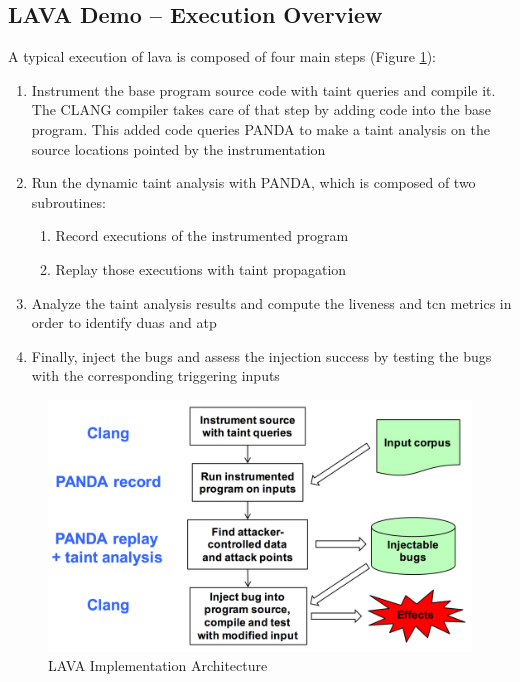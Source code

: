 \subsection{LAVA Demo -- Execution Overview}

A typical execution of \gls{lava} is composed of four main steps (Figure \ref{fig:lava-process}):

\begin{enumerate}
    \item Instrument the base program source code with taint queries and compile it. The CLANG compiler takes care of that step by adding code into the base program. This added code queries PANDA to make a taint analysis on the source locations pointed by the instrumentation
    \item Run the dynamic taint analysis with PANDA, which is composed of two subroutines:
        \begin{enumerate}
            \item Record executions of the instrumented program
            \item Replay those executions with taint propagation
        \end{enumerate}
    \item Analyze the taint analysis results and compute the liveness and \gls{tcn} metrics in order to identify \glspl{dua} and \gls{atp}
    \item Finally, inject the bugs and assess the injection success by testing the bugs with the corresponding triggering inputs
\end{enumerate}

\begin{figure}[ht]
    \centering
    \includegraphics[scale=0.35]{figures/lava-process}
    \caption{LAVA Implementation Architecture \cite{dolan2016lava}}
    \label{fig:lava-process}
\end{figure}


